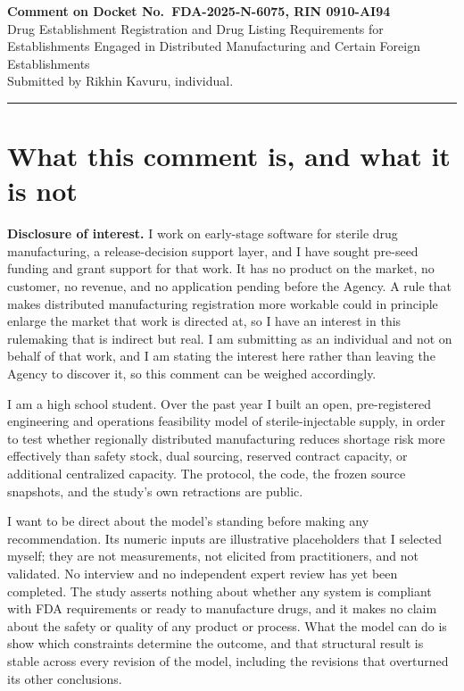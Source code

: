 \documentclass[11pt,letterpaper]{article}
\begin{document}
\pagestyle{plain}

{\bfseries Comment on Docket No.\ FDA-2025-N-6075, RIN 0910-AI94}\\
Drug Establishment Registration and Drug Listing Requirements for Establishments Engaged in
Distributed Manufacturing and Certain Foreign Establishments\\[0.7ex]
Submitted by Rikhin Kavuru, individual.

\vspace{0.4ex}\hrule\vspace{1.2ex}

\section{What this comment is, and what it is not}

\textbf{Disclosure of interest.} I work on early-stage software for sterile drug manufacturing, a
release-decision support layer, and I have sought pre-seed funding and grant support for that work.
It has no product on the market, no customer, no revenue, and no application pending before the
Agency. A rule that makes distributed manufacturing registration more workable could in principle
enlarge the market that work is directed at, so I have an interest in this rulemaking that is
indirect but real. I am submitting as an individual and not on behalf of that work, and I am stating
the interest here rather than leaving the Agency to discover it, so this comment can be weighed
accordingly.

I am a high school student. Over the past year I built an open, pre-registered engineering and
operations feasibility model of sterile-injectable supply, in order to test whether regionally
distributed manufacturing reduces shortage risk more effectively than safety stock, dual sourcing,
reserved contract capacity, or additional centralized capacity. The protocol, the code, the frozen
source snapshots, and the study's own retractions are public.

I want to be direct about the model's standing before making any recommendation. Its numeric inputs
are illustrative placeholders that I selected myself; they are not measurements, not elicited from
practitioners, and not validated. No interview and no independent expert review has yet been
completed. The study asserts nothing about whether any system is compliant with FDA requirements or
ready to manufacture drugs, and it makes no claim about the safety or quality of any product or
process. What the model can do is show which constraints determine the outcome, and that structural
result is stable across every revision of the model, including the revisions that overturned its
other conclusions.
\end{document}
